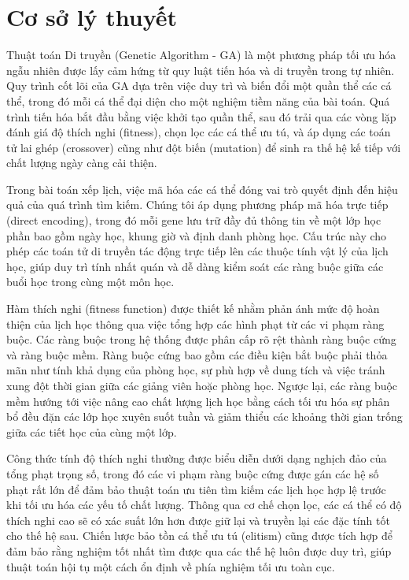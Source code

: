 \section{Cơ sở lý thuyết}

Thuật toán Di truyền (Genetic Algorithm - GA) là một phương pháp tối ưu hóa ngẫu nhiên được lấy cảm hứng từ quy luật tiến hóa và di truyền trong tự nhiên. Quy trình cốt lõi của GA dựa trên việc duy trì và biến đổi một quần thể các cá thể, trong đó mỗi cá thể đại diện cho một nghiệm tiềm năng của bài toán. Quá trình tiến hóa bắt đầu bằng việc khởi tạo quần thể, sau đó trải qua các vòng lặp đánh giá độ thích nghi (fitness), chọn lọc các cá thể ưu tú, và áp dụng các toán tử lai ghép (crossover) cũng như đột biến (mutation) để sinh ra thế hệ kế tiếp với chất lượng ngày càng cải thiện.

Trong bài toán xếp lịch, việc mã hóa các cá thể đóng vai trò quyết định đến hiệu quả của quá trình tìm kiếm. Chúng tôi áp dụng phương pháp mã hóa trực tiếp (direct encoding), trong đó mỗi gene lưu trữ đầy đủ thông tin về một lớp học phần bao gồm ngày học, khung giờ và định danh phòng học. Cấu trúc này cho phép các toán tử di truyền tác động trực tiếp lên các thuộc tính vật lý của lịch học, giúp duy trì tính nhất quán và dễ dàng kiểm soát các ràng buộc giữa các buổi học trong cùng một môn học.

Hàm thích nghi (fitness function) được thiết kế nhằm phản ánh mức độ hoàn thiện của lịch học thông qua việc tổng hợp các hình phạt từ các vi phạm ràng buộc. Các ràng buộc trong hệ thống được phân cấp rõ rệt thành ràng buộc cứng và ràng buộc mềm. Ràng buộc cứng bao gồm các điều kiện bắt buộc phải thỏa mãn như tính khả dụng của phòng học, sự phù hợp về dung tích và việc tránh xung đột thời gian giữa các giảng viên hoặc phòng học. Ngược lại, các ràng buộc mềm hướng tới việc nâng cao chất lượng lịch học bằng cách tối ưu hóa sự phân bổ đều đặn các lớp học xuyên suốt tuần và giảm thiểu các khoảng thời gian trống giữa các tiết học của cùng một lớp.

Công thức tính độ thích nghi thường được biểu diễn dưới dạng nghịch đảo của tổng phạt trọng số, trong đó các vi phạm ràng buộc cứng được gán các hệ số phạt rất lớn để đảm bảo thuật toán ưu tiên tìm kiếm các lịch học hợp lệ trước khi tối ưu hóa các yếu tố chất lượng. Thông qua cơ chế chọn lọc, các cá thể có độ thích nghi cao sẽ có xác suất lớn hơn được giữ lại và truyền lại các đặc tính tốt cho thế hệ sau. Chiến lược bảo tồn cá thể ưu tú (elitism) cũng được tích hợp để đảm bảo rằng nghiệm tốt nhất tìm được qua các thế hệ luôn được duy trì, giúp thuật toán hội tụ một cách ổn định về phía nghiệm tối ưu toàn cục.

